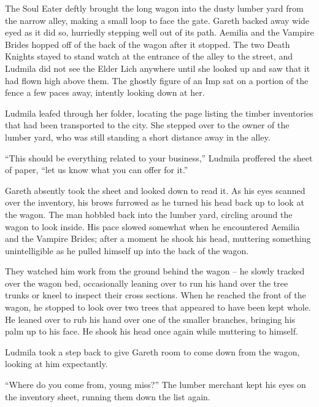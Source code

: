 The Soul Eater deftly brought the long wagon into the dusty lumber yard from the narrow alley, making a small loop to face the gate. Gareth backed away wide eyed as it did so, hurriedly stepping well out of its path. Aemilia and the Vampire Brides hopped off of the back of the wagon after it stopped. The two Death Knights stayed to stand watch at the entrance of the alley to the street, and Ludmila did not see the Elder Lich anywhere until she looked up and saw that it had flown high above them. The ghostly figure of an Imp sat on a portion of the fence a few paces away, intently looking down at her.

 

Ludmila leafed through her folder, locating the page listing the timber inventories that had been transported to the city. She stepped over to the owner of the lumber yard, who was still standing a short distance away in the alley.

 

“This should be everything related to your business,” Ludmila proffered the sheet of paper, “let us know what you can offer for it.”

 

Gareth absently took the sheet and looked down to read it. As his eyes scanned over the inventory, his brows furrowed as he turned his head back up to look at the wagon. The man hobbled back into the lumber yard, circling around the wagon to look inside. His pace slowed somewhat when he encountered Aemilia and the Vampire Brides; after a moment he shook his head, muttering something unintelligible as he pulled himself up into the back of the wagon.

 

They watched him work from the ground behind the wagon – he slowly tracked over the wagon bed, occasionally leaning over to run his hand over the tree trunks or kneel to inspect their cross sections. When he reached the front of the wagon, he stopped to look over two trees that appeared to have been kept whole. He leaned over to rub his hand over one of the smaller branches, bringing his palm up to his face. He shook his head once again while muttering to himself.

 

Ludmila took a step back to give Gareth room to come down from the wagon, looking at him expectantly.

 

“Where do you come from, young miss?” The lumber merchant kept his eyes on the inventory sheet, running them down the list again.

